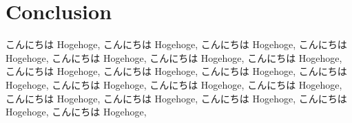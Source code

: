\chapter{Conclusion}\label{ch:conclusion}
こんにちは Hogehoge, こんにちは Hogehoge, こんにちは Hogehoge, こんにちは Hogehoge, こんにちは Hogehoge, こんにちは Hogehoge, こんにちは Hogehoge, こんにちは Hogehoge, こんにちは Hogehoge, こんにちは Hogehoge, こんにちは Hogehoge, こんにちは Hogehoge, こんにちは Hogehoge, こんにちは Hogehoge, こんにちは Hogehoge, こんにちは Hogehoge, こんにちは Hogehoge, こんにちは Hogehoge, こんにちは Hogehoge, 